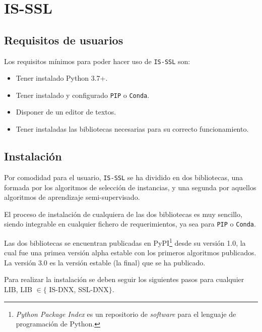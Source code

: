 \FloatBarrier
\section{IS-SSL}
\subsection{Requisitos de usuarios}
Los requisitos mínimos para poder hacer uso de \texttt{IS-SSL} son:
\begin{itemize}
\item Tener instalado Python 3.7+.
\item Tener instalado y configurado \texttt{PIP} o \texttt{Conda}.
\item Disponer de un editor de textos.
\item Tener instaladas las bibliotecas necesarias para su correcto funcionamiento.
\end{itemize}

\subsection{Instalación}

Por comodidad para el usuario, \texttt{IS-SSL} se ha dividido en dos bibliotecas, una formada por los algoritmos de selección de instancias, y una segunda por aquellos algoritmos de aprendizaje semi-supervisado.

El proceso de instalación de cualquiera de las dos bibliotecas es muy sencillo, siendo integrable en cualquier fichero de requerimientos, ya sea para \texttt{PIP} o \texttt{Conda}.

Las dos bibliotecas se encuentran publicadas en PyPI\footnote{\textit{Python Package Index} es un repositorio de \textit{software} para el lenguaje de programación de Python.} desde su versión 1.0, la cual fue una primea versión alpha estable con los primeros algoritmos publicados. 
La versión 3.0 es la versión estable (la final) que se ha publicado.


Para realizar la instalación se deben seguir los siguientes pasos para cualquier LIB, LIB $\in \lbrace$ IS-DNX, SSL-DNX$\rbrace$.

